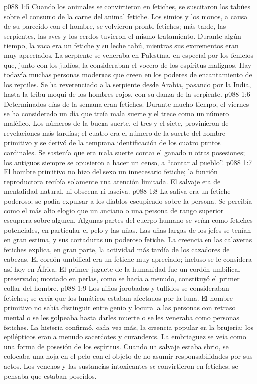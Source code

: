 \vs p088 1:5 Cuando los animales se convirtieron en fetiches, se suscitaron los tabúes sobre el consumo de la carne del animal fetiche. Los simios y los monos, a causa de su parecido con el hombre, se volvieron pronto fetiches; más tarde, las serpientes, las aves y los cerdos tuvieron el mismo tratamiento. Durante algún tiempo, la vaca era un fetiche y su leche tabú, mientras sus excrementos eran muy apreciados. La serpiente se veneraba en Palestina, en especial por los fenicios que, junto con los judíos, la consideraban el vocero de los espíritus malignos. Hay todavía muchas personas modernas que creen en los poderes de encantamiento de los reptiles. Se ha reverenciado a la serpiente desde Arabia, pasando por la India, hasta la tribu moqui de los hombres rojos, con su danza de la serpiente.
\vs p088 1:6 Determinados días de la semana eran fetiches. Durante mucho tiempo, el viernes se ha considerado un día que traía mala suerte y el trece como un número maléfico. Los números de la buena suerte, el tres y el siete, provinieron de revelaciones más tardías; el cuatro era el número de la suerte del hombre primitivo y se derivó de la temprana identificación de los cuatro puntos cardinales. Se sostenía que era mala suerte contar el ganado u otras posesiones; los antiguos siempre se opusieron a hacer un censo, a “contar al pueblo”.
\vs p088 1:7 El hombre primitivo no hizo del sexo un innecesario fetiche; la función reproductora recibía solamente una atención limitada. El salvaje era de mentalidad natural, ni obscena ni lasciva.
\vs p088 1:8 La saliva era un fetiche poderoso; se podía expulsar a los diablos escupiendo sobre la persona. Se percibía como el más alto elogio que un anciano o una persona de rango superior escupiera sobre alguien. Algunas partes del cuerpo humano se veían como fetiches potenciales, en particular el pelo y las uñas. Las uñas largas de los jefes se tenían en gran estima, y sus cortaduras un poderoso fetiche. La creencia en las calaveras fetiches explica, en gran parte, la actividad más tardía de los cazadores de cabezas. El cordón umbilical era un fetiche muy apreciado; incluso se le considera así hoy en África. El primer juguete de la humanidad fue un cordón umbilical preservado; montado en perlas, como se hacía a menudo, constituyó el primer collar del hombre.
\vs p088 1:9 Los niños jorobados y tullidos se consideraban fetiches; se creía que los lunáticos estaban afectados por la luna. El hombre primitivo no sabía distinguir entre genio y locura; a las personas con retraso mental o se les golpeaba hasta darles muerte o se les veneraba como personas fetiches. La histeria confirmó, cada vez más, la creencia popular en la brujería; los epilépticos eran a menudo sacerdotes y curanderos. La embriaguez se veía como una forma de posesión de los espíritus. Cuando un salvaje estaba ebrio, se colocaba una hoja en el pelo con el objeto de no asumir responsabilidades por sus actos. Los venenos y las sustancias intoxicantes se convirtieron en fetiches; se pensaba que estaban poseídos.
